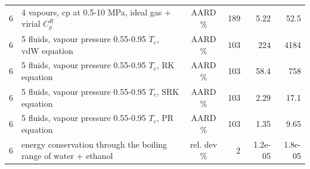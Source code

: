 \begin{tabular}{c p{8.6cm} c r r r}
6 & 4 vapours, cp at 0.5-10 MPa, ideal gas + virial $C_p^R$ & AARD \% & 189 & 5.22 & 52.5 \\
6 & 5 fluids, vapour pressure 0.55-0.95 $T_c$, vdW equation & AARD \% & 103 & 224 & 4184 \\
6 & 5 fluids, vapour pressure 0.55-0.95 $T_c$, RK equation & AARD \% & 103 & 58.4 & 758 \\
6 & 5 fluids, vapour pressure 0.55-0.95 $T_c$, SRK equation & AARD \% & 103 & 2.29 & 17.1 \\
6 & 5 fluids, vapour pressure 0.55-0.95 $T_c$, PR equation & AARD \% & 103 & 1.35 & 9.65 \\
6 & energy conservation through the boiling range of water + ethanol & rel. dev \% & 2 & 1.2e-05 & 1.8e-05 \\
\bottomrule
\end{tabular}
